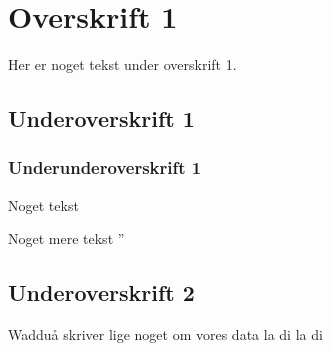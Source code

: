 \section{Overskrift 1}

Her er noget tekst under overskrift 1.

\subsection{Underoverskrift 1}

\subsubsection{Underunderoverskrift 1}

Noget tekst

Noget mere tekst
''
\subsection{Underoverskrift 2}
Wadduå skriver lige noget om vores data la di la di
